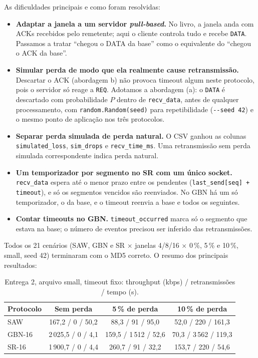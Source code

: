 \documentclass[11pt,a4paper]{article}
\newcommand{\cod}[1]{\textcolor{codverde}{\texttt{\small #1}}}
\begin{document}
As dificuldades principais e como foram resolvidas:
\begin{itemize}
  \item \textbf{Adaptar a janela a um servidor \emph{pull-based}.} No livro, a janela anda com ACKs
        recebidos pelo remetente; aqui o cliente controla tudo e recebe \cod{DATA}. Passamos a tratar
        ``chegou o DATA da base'' como o equivalente do ``chegou o ACK da base''.
  \item \textbf{Simular perda de modo que ela realmente cause retransmissão.} Descartar o ACK
        (abordagem b) não provoca timeout algum neste protocolo, pois o servidor só reage a \cod{REQ}.
        Adotamos a abordagem (a): o \cod{DATA} é descartado com probabilidade $P$ dentro de
        \cod{recv\_data}, antes de qualquer processamento, com \cod{random.Random(seed)} para
        repetibilidade (\cod{-{}-seed 42}) e o mesmo ponto de aplicação nos três protocolos.
  \item \textbf{Separar perda simulada de perda natural.} O CSV ganhou as colunas
        \cod{simulated\_loss}, \cod{sim\_drops} e \cod{recv\_time\_ms}. Uma retransmissão sem perda
        simulada correspondente indica perda natural.
  \item \textbf{Um temporizador por segmento no SR com um único socket.} \cod{recv\_data} espera até o
        menor prazo entre os pendentes (\cod{last\_send[seq] + timeout}), e só os segmentos vencidos
        são reenviados. No GBN há um só temporizador, o da base, e o timeout reenvia a base e todos os
        seguintes.
  \item \textbf{Contar timeouts no GBN.} \cod{timeout\_occurred} marca só o segmento que estava na
        base; o número de eventos precisou ser inferido das retransmissões.
\end{itemize}

Todos os 21 cenários (SAW, GBN e SR $\times$ janelas 4/8/16 $\times$ 0\,\%, 5\,\% e 10\,\%, small,
seed 42) terminaram com o MD5 correto. O resumo dos principais resultados:

\begin{table}[H]
\centering\small
\caption{Entrega 2, arquivo small, timeout fixo: throughput (kbps) / retransmissões / tempo (s).}
\label{tab:e2}
\begin{tabular}{@{}l ccc@{}}
\toprule
\textbf{Protocolo} & \textbf{Sem perda} & \textbf{5\,\% de perda} & \textbf{10\,\% de perda}\\
\midrule
SAW    & 167,2 / 0 / 50,2    & 88,3 / 91 / 95,0      & 52,0 / 220 / 161,3\\
GBN-16 & 2\,025,5 / 0 / 4,1  & 159,5 / 1\,512 / 52,6 & 70,3 / 3\,562 / 119,3\\
SR-16  & 1\,900,7 / 0 / 4,4  & 260,7 / 91 / 32,2     & 153,7 / 220 / 54,6\\
\bottomrule
\end{tabular}
\end{table}
\end{document}
